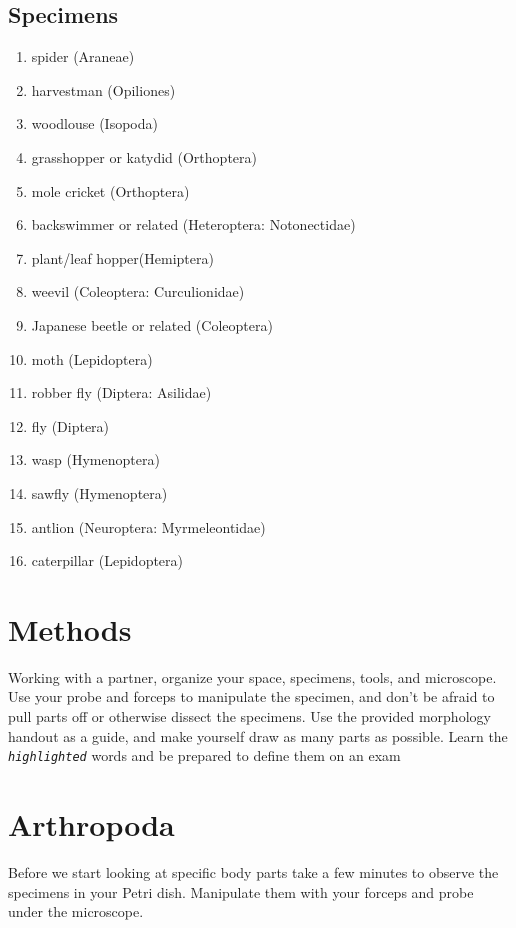\documentclass[letterpaper, 11pt]{article}
\newcommand{\latinword}[1]{\texttt{\itshape #1}}%
\begin{document}
\subsection*{Specimens}
\begin{enumerate}
	\item {spider (Araneae)}
	\item {harvestman (Opiliones)}
	\item {woodlouse (Isopoda)}
	\item {grasshopper or katydid (Orthoptera)}
    \item mole cricket (Orthoptera)
	\item {backswimmer or related (Heteroptera: Notonectidae)}
	\item {plant/leaf hopper(Hemiptera)}
	\item {weevil (Coleoptera: Curculionidae)}
    \item Japanese beetle or related (Coleoptera)
	\item {moth (Lepidoptera)}
	\item {robber fly (Diptera: Asilidae)}
	\item {fly (Diptera)}
	\item {wasp (Hymenoptera)}
	\item {sawfly (Hymenoptera)}
	\item {antlion (Neuroptera: Myrmeleontidae)}
    \item caterpillar (Lepidoptera)
\end{enumerate}

\section*{Methods}
Working with a partner, organize your space, specimens, tools, and microscope. Use your probe and forceps to manipulate the specimen, and don't be afraid to pull parts off or otherwise dissect the specimens. Use the provided morphology handout as a guide, and make yourself draw as many parts as possible. Learn the \latinword{highlighted} words and be prepared to define them on an exam

\section{Arthropoda}
Before we start looking at specific body parts take a few minutes to observe the specimens in your Petri dish. Manipulate them with your forceps and probe under the microscope.\\
\end{document}
